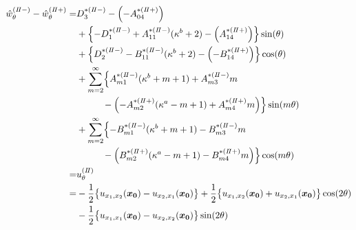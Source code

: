 \begin{align}
	\hat{w}_{\theta}^{(I\hspace{-.15em}I-)}-\hat{w}_{\theta}^{(I\hspace{-.15em}I+)} =&D_{3}^{*(I\hspace{-.15em}I-)}-\Bigl(-A_{04}^{*(I\hspace{-.15em}I+)}\Bigr)
	\nonumber
	\\
	&+\Bigl\{-D_{1}^{*(I\hspace{-.15em}I-)}+A_{11}^{*(I\hspace{-.15em}I-)}(\kappa^{b}+2)
	-\Bigl(A_{14}^{*(I\hspace{-.15em}I+)}\Bigr)\Bigr\}\sin(\theta)
	\nonumber
	\\
	&+\Bigl\{D_{2}^{*(I\hspace{-.15em}I-)}-B_{11}^{*(I\hspace{-.15em}I-)}(\kappa^{b}+2)
	-\Bigl(-B_{14}^{*(I\hspace{-.15em}I+)}\Bigr)\Bigr\}\cos(\theta)
	\nonumber
	\\
	&+\sum_{m=2}^{\infty}\Bigl\{A_{m1}^{*(I\hspace{-.15em}I-)}(\kappa^{b}+m+1)
	+A_{m3}^{*(I\hspace{-.15em}I-)}m
	\nonumber
	\\
	&\hspace{1.0cm}-\Bigl(-A_{m2}^{*(I\hspace{-.15em}I+)}(\kappa^{a}-m+1)
	+A_{m4}^{*(I\hspace{-.15em}I+)}m\Bigr)\Bigr\}\sin(m\theta)
	\nonumber
	\\
	&+\sum_{m=2}^{\infty}\Bigl\{-B_{m1}^{*(I\hspace{-.15em}I-)}(\kappa^{b}+m+1)
	-B_{m3}^{*(I\hspace{-.15em}I-)}m
	\nonumber
	\\
	&\hspace{1.0cm}-\Bigl(B_{m2}^{*(I\hspace{-.15em}I+)}(\kappa^{a}-m+1)
	-B_{m4}^{*(I\hspace{-.15em}I+)}m\Bigr)\Bigr\}\cos(m\theta)
	\nonumber
	\\
	=&u_{\theta}^{(I\hspace{-.15em}I)}
	\nonumber
	\\
	=&-\frac{1}{2}\bigl\{u_{x_{1},x_{2}}(\bm{x_{0}})-u_{x_{2},x_{1}}(\bm{x_{0}})\bigr\}
	+\frac{1}{2}\bigl\{u_{x_{1},x_{2}}(\bm{x_{0}})+u_{x_{2},x_{1}}(\bm{x_{0}})\bigr\}\cos(2\theta)
	\nonumber
	\\
	&-\frac{1}{2}\bigl\{u_{x_{1},x_{1}}(\bm{x_{0}})-u_{x_{2},x_{2}}(\bm{x_{0}})\bigr\}\sin(2\theta)
	\label{eq:UTh2eq}
\end{align}

